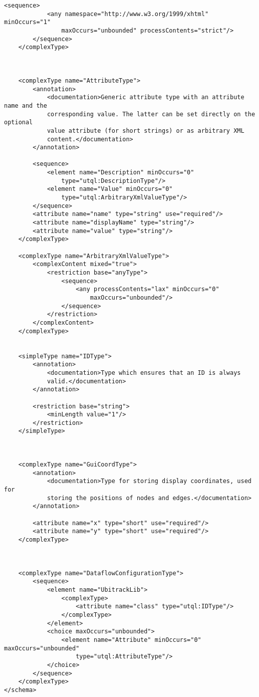 \documentclass[11pt]{article}
\begin{document}
\begin{Verbatim}[fontsize=\footnotesize,tabsize=2]
        <sequence>
            <any namespace="http://www.w3.org/1999/xhtml" minOccurs="1" 
				maxOccurs="unbounded" processContents="strict"/>
        </sequence>
    </complexType>
    
    
    
    <complexType name="AttributeType">
        <annotation>
            <documentation>Generic attribute type with an attribute name and the
            corresponding value. The latter can be set directly on the optional
            value attribute (for short strings) or as arbitrary XML
            content.</documentation>
        </annotation>
        
        <sequence>
            <element name="Description" minOccurs="0"
				type="utql:DescriptionType"/>
            <element name="Value" minOccurs="0"
				type="utql:ArbitraryXmlValueType"/>
        </sequence>
        <attribute name="name" type="string" use="required"/>
        <attribute name="displayName" type="string"/>
        <attribute name="value" type="string"/>
    </complexType>
    
    <complexType name="ArbitraryXmlValueType">
        <complexContent mixed="true">
            <restriction base="anyType">
                <sequence>
                    <any processContents="lax" minOccurs="0"
						maxOccurs="unbounded"/>
                </sequence>
            </restriction>
        </complexContent>
    </complexType>
    
    
    <simpleType name="IDType">
        <annotation>
            <documentation>Type which ensures that an ID is always
            valid.</documentation>
        </annotation>
        
        <restriction base="string">
            <minLength value="1"/>
        </restriction>
    </simpleType>
    
    
    
    <complexType name="GuiCoordType">
        <annotation>
            <documentation>Type for storing display coordinates, used for
            storing the positions of nodes and edges.</documentation>
        </annotation>
        
        <attribute name="x" type="short" use="required"/>
        <attribute name="y" type="short" use="required"/>
    </complexType>
    
    
    
    <complexType name="DataflowConfigurationType">
        <sequence>
            <element name="UbitrackLib">
                <complexType>
                    <attribute name="class" type="utql:IDType"/>
                </complexType>
            </element>
            <choice maxOccurs="unbounded">
                <element name="Attribute" minOccurs="0" maxOccurs="unbounded"
					type="utql:AttributeType"/>
            </choice>
        </sequence>
    </complexType>
</schema>
\end{Verbatim}



\end{document}
